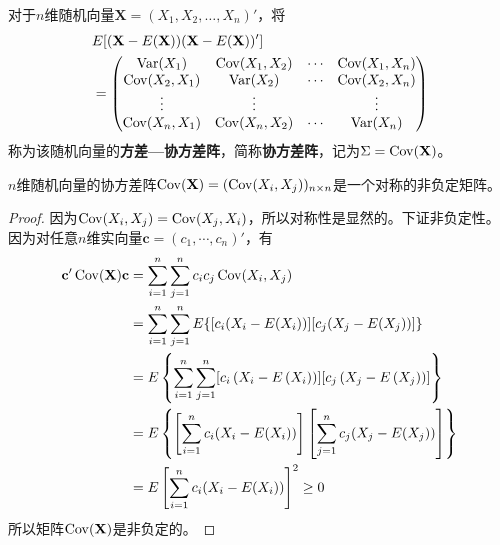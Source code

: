 \begin{definition}[协方差矩阵]
    对于$n$维随机向量$\mathbf{X}=(X_1,X_2,\ldots,X_n)'$，将
    \begin{align*}
         & E[ (\mathbf{X}-E(\mathbf{X})) (\mathbf{X}-E(\mathbf{X}))' ] \\
         & =\begin{pmatrix}
                \operatorname{Var}(X_1)     & \operatorname{Cov}(X_1,X_2) & \cdots & \operatorname{Cov}(X_1,X_n) \\
                \operatorname{Cov}(X_2,X_1) & \operatorname{Var}(X_2)     & \cdots & \operatorname{Cov}(X_2,X_n) \\
                \vdots        & \vdots        &        & \vdots        \\
                \operatorname{Cov}(X_n,X_1) & \operatorname{Cov}(X_n,X_2) & \cdots & \operatorname{Var}(X_n)
            \end{pmatrix}
    \end{align*}
    称为该随机向量的\textbf{方差—协方差阵}，简称\textbf{协方差阵}，记为$\Sigma=\operatorname{Cov}(\mathbf{X})$。
\end{definition}

\begin{theorem}
    $n$维随机向量的协方差阵$\operatorname{Cov}(\mathbf{X})=( \operatorname{Cov}(X_i,X_j) )_{n\times n}$是一个对称的非负定矩阵。
\end{theorem}
\begin{proof}
    因为$\operatorname{Cov}(X_i,X_j)=\operatorname{Cov}(X_j,X_i)$，所以对称性是显然的。下证非负定性。因为对任意$n$维实向量$\mathbf{c}=(c_1,\cdots ,c_n)'$，有
    \begin{align*}
        \mathbf{c}'\operatorname{Cov}(\mathbf{X})\mathbf{c} & = \sum_{i=1}^n\sum_{j=1}^n c_i c_j \operatorname{Cov}(X_i,X_j)                                                                           \\
                                              & = \sum_{i=1}^n\sum_{j=1}^n E\{ [c_i (X_i-E(X_i))] [c_j(X_j-E(X_j))] \}                                                     \\
                                              & = E\left\{\sum_{i=1}^n \sum_{j=1}^n [c_i\left(X_i-E\left(X_i\right)\right)][c_j\left(X_j-E\left(X_j\right)\right)]\right\} \\
                                              & = E\left\{\left[\sum_{i=1}^n c_i(X_i-E(X_i))\right]\left[\sum_{j=1}^n  c_j(X_j-E(X_j))\right]\right\}                      \\
                                              & = E\left[\sum_{i=1}^n  c_i(X_i-E(X_i))\right]^2 \ge 0
    \end{align*}
    所以矩阵$\operatorname{Cov}(\mathbf{X})$是非负定的。
\end{proof}

